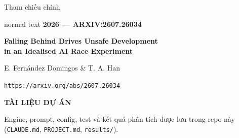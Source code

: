 \documentclass[9pt,aspectratio=169]{beamer}
\begin{document}
\begin{frame}{Tham chiếu chính}
\begin{beamercolorbox}[sep=.5cm,rounded=true]{normal text}
{\scriptsize\color{skyblue}\bfseries 2026 --- ARXIV:2607.26034}\par\vspace{.25cm}
{\large\bfseries Falling Behind Drives Unsafe Development\\in an Idealised AI Race Experiment}\par\vspace{.2cm}
{\normalsize E. Fernández Domingos \& T. A. Han}\par\vspace{.35cm}
{\color{skyblue}\texttt{https://arxiv.org/abs/2607.26034}}
\end{beamercolorbox}
\vspace{0.6em}
{\small\bfseries TÀI LIỆU DỰ ÁN}\par
{\color{gray}\small Engine, prompt, config, test và kết quả phân tích được lưu trong repo này (\texttt{CLAUDE.md}, \texttt{PROJECT.md}, \texttt{results/}).}
\end{frame}
\end{document}
